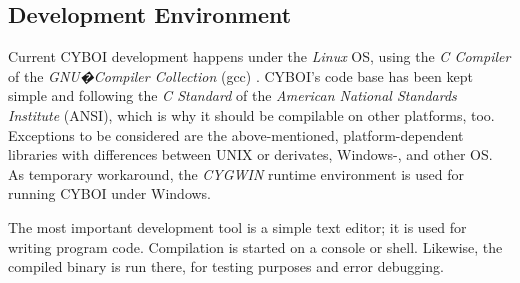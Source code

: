 %
%
%
%
%
%
%

\subsection{Development Environment}
\label{development_environment_heading}

Current CYBOI development happens under the \emph{Linux} OS, using the
\emph{C Compiler} of the \emph{GNU�Compiler Collection} (gcc) \cite{gcc}.
CYBOI's code base has been kept simple and following the \emph{C Standard}
\cite{ansic} of the \emph{American National Standards Institute} (ANSI), which
is why it should be compilable on other platforms, too. Exceptions to be
considered are the above-mentioned, platform-dependent libraries with
differences between UNIX or derivates, Windows-, and other OS. As temporary
workaround, the \emph{CYGWIN} runtime environment \cite{cygwin} is used for
running CYBOI under Windows.

The most important development tool is a simple text editor; it is used for
writing program code. Compilation is started on a console or shell. Likewise,
the compiled binary is run there, for testing purposes and error debugging.
